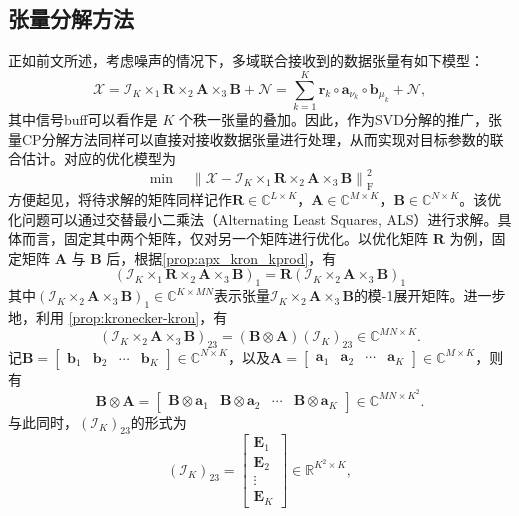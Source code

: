 \subsection{张量分解方法}
正如前文所述，考虑噪声的情况下，多域联合接收到的数据张量有如下模型：
\[
    \mathcal{X} = \mathcal{I}_{K} \times_1 \mathbf{R} \times_2 \mathbf{A} \times_3 \mathbf{B} + \mathcal{N} = \sum_{k=1}^K \bm{r}_k \circ \bm{a}_{\nu_k} \circ \bm{b}_{\mu_k} + \mathcal{N},
\]
其中信号buff可以看作是 \( K \) 个秩一张量的叠加。因此，作为SVD分解的推广，张量CP分解方法同样可以直接对接收数据张量进行处理，从而实现对目标参数的联合估计。对应的优化模型为
\[
    \min \quad \left\| \mathcal{X} - \mathcal{I}_K \times_1 \mathbf{R} \times_2 \mathbf{A} \times_3 \mathbf{B} \right\|_{\mathrm{F}}^2
\]
方便起见，将待求解的矩阵同样记作\( \mathbf{R} \in \mathbb{C}^{L \times K} \)，\( \mathbf{A} \in \mathbb{C}^{M \times K} \)，\( \mathbf{B} \in \mathbb{C}^{N \times K} \)。该优化问题可以通过交替最小二乘法（Alternating Least Squares, ALS）进行求解。具体而言，固定其中两个矩阵，仅对另一个矩阵进行优化。以优化矩阵 \( \mathbf{R} \) 为例，固定矩阵 \( \mathbf{A} \) 与 \( \mathbf{B} \) 后，根据\cref{prop:apx_kron_kprod}，有
\[
    (\mathcal{I}_K \times_1 \mathbf{R} \times_2 \mathbf{A} \times_3 \mathbf{B})_1 = \mathbf{R} (\mathcal{I}_K \times_2 \mathbf{A} \times_3 \mathbf{B})_1
\]
其中\( (\mathcal{I}_K \times_2 \mathbf{A} \times_3 \mathbf{B})_1 \in \mathbb{C}^{K \times M N} \)表示张量\( \mathcal{I}_K \times_2 \mathbf{A} \times_3 \mathbf{B} \)的模-1展开矩阵。进一步地，利用 \cref{prop:kronecker-kron}，有
\[
    (\mathcal{I}_K \times_2 \mathbf{A} \times_3 \mathbf{B})_{23} =  (\mathbf{B} \otimes \mathbf{A}) (\mathcal{I}_K)_{23} \in \mathbb{C}^{M N \times K}.
\]
记\( \mathbf{B} = \begin{bmatrix} \bm{b}_1 & \bm{b}_2 & \cdots & \bm{b}_K \end{bmatrix} \in \mathbb{C}^{N \times K} \)，以及\( \mathbf{A} = \begin{bmatrix} \bm{a}_1 & \bm{a}_2 & \cdots & \bm{a}_K \end{bmatrix} \in \mathbb{C}^{M \times K} \)，则有
\[
    \mathbf{B} \otimes \mathbf{A} = \begin{bmatrix}
        \mathbf{B} \otimes \bm{a}_1 & \mathbf{B} \otimes \bm{a}_2 & \cdots & \mathbf{B} \otimes \bm{a}_K
    \end{bmatrix} \in \mathbb{C}^{M N \times K^2}.
\]
与此同时，\( (\mathcal{I}_K)_{23} \)的形式为
\[
    (\mathcal{I}_K)_{23} = \begin{bmatrix}
        \mathbf{E}_1 \\ \mathbf{E}_2  \\ \vdots \\ \mathbf{E}_K
    \end{bmatrix} \in \mathbb{R}^{K^2 \times K},
\]
